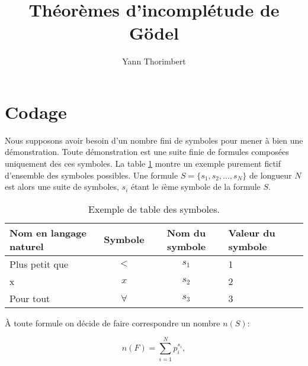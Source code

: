 \documentclass[11pt, final]{article}
\title{Théorèmes d'incomplétude de Gödel}
\author{Yann Thorimbert}
\begin{document}
   
\maketitle




\section{Codage}

Nous supposons avoir besoin d'un nombre fini de symboles pour mener à bien une démonstration. Toute démonstration est une suite finie de formules composées uniquement des ces symboles. La table \ref{tab:symbols} montre un exemple purement fictif d'ensemble des symboles possibles. Une formule $S=\{s_1, s_2, ... , s_N\}$ de longueur $N$ est alors une suite de symboles, $s_i$ étant le $i$ème symbole de la formule $S$.

\begin{table}
	\begin{tabular}{l|c|c|l}
	\hline
	Nom en langage naturel & Symbole & Nom du symbole & Valeur du symbole \\
	\hline
	Plus petit que & $<$ & $s_1$ & 1 \\
	x & $x$ & $s_2$ & 2 \\
	Pour tout & $\forall$ & $s_3$ & 3 \\
	\end{tabular}
\caption{Exemple de table des symboles.}
\label{tab:symbols}
\end{table}

À toute formule on décide de faire correspondre un nombre $n(S)$:

\begin{equation}
n(F) = \sum_{i=1}^{N} p_i^{s_i},
\end{equation}
\end{document}
